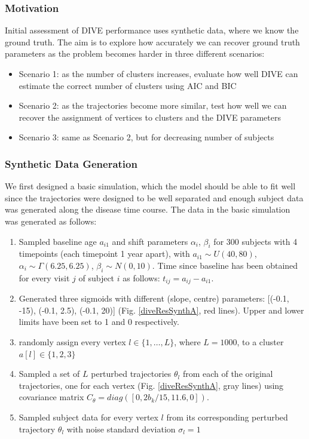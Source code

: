 \subsubsection{Motivation}

Initial assessment of DIVE performance uses synthetic data, where we know the ground truth. The aim is to explore how accurately we can recover ground truth parameters as the problem becomes harder in three different scenarios:
\begin{itemize}
 \item Scenario 1: as the number of clusters increases, evaluate how well DIVE can estimate the correct number of clusters using AIC and BIC
 \item Scenario 2: as the trajectories become more similar, test how well we can recover the assignment of vertices to clusters and the DIVE parameters
 \item Scenario 3: same as Scenario 2, but for decreasing number of subjects
\end{itemize}

\subsubsection{Synthetic Data Generation}

We first designed a basic simulation, which the model should be able to fit well since the trajectories were designed to be well separated and enough subject data was generated along the disease time course. The data in the basic simulation was generated as follows: 

\begin{enumerate}
 \item Sampled baseline age $a_{i1}$ and shift parameters $\alpha_i$, $\beta_i$ for 300 subjects with 4 timepoints (each timepoint 1 year apart), with $a_{i1} \sim U(40,80)$, $\alpha_i \sim \Gamma(6.25, 6.25)$, $\beta_i \sim N(0, 10)$. Time since baseline has been obtained for every visit $j$ of subject $i$ as follows: $t_{ij} = a_{ij} - a_{i1}$.
 \item Generated three sigmoids with different (slope, centre) parameters: [(-0.1, -15), (-0.1, 2.5), (-0.1, 20)] (Fig. \ref{diveResSynthA}, red lines). Upper and lower limits have been set to 1 and 0 respectively.
 \item randomly assign every vertex $l \in \{1, \dots, L\}$, where $L = 1000$, to a cluster $a[l] \in \{1,2,3\}$
 \item Sampled a set of $L$ perturbed trajectories $\theta_l$ from each of the original trajectories, one for each vertex (Fig. \ref{diveResSynthA}, gray lines) using covariance matrix $C_{\theta} = diag([0, 2b_k/15,  11.6, 0])$.
 \item Sampled subject data for every vertex $l$ from its corresponding perturbed trajectory $\theta_l$ with noise standard deviation $\sigma_l = 1$
\end{enumerate}

